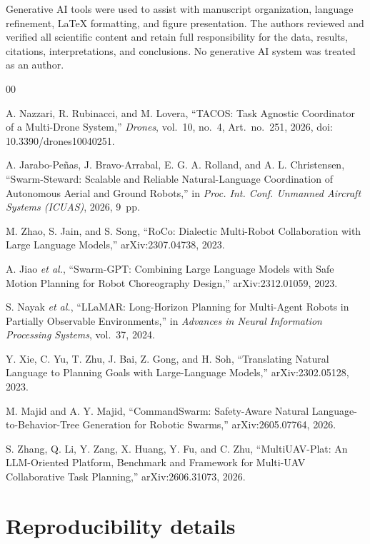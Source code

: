 \documentclass{article}
\begin{document}
Generative AI tools were used to assist with manuscript organization, language
refinement, \LaTeX{} formatting, and figure presentation. The authors reviewed
and verified all scientific content and retain full responsibility for the
data, results, citations, interpretations, and conclusions. No generative AI
system was treated as an author.

\begin{thebibliography}{00}

A. Nazzari, R. Rubinacci, and M. Lovera, ``TACOS: Task Agnostic Coordinator of
a Multi-Drone System,'' \emph{Drones}, vol.~10, no.~4, Art.~no.~251, 2026,
doi: 10.3390/drones10040251.

A. Jarabo-Pe\~nas, J. Bravo-Arrabal, E. G. A. Rolland, and A. L. Christensen,
``Swarm-Steward: Scalable and Reliable Natural-Language Coordination of
Autonomous Aerial and Ground Robots,'' in \emph{Proc. Int. Conf. Unmanned
Aircraft Systems (ICUAS)}, 2026, 9~pp.

M. Zhao, S. Jain, and S. Song, ``RoCo: Dialectic Multi-Robot Collaboration with
Large Language Models,'' arXiv:2307.04738, 2023.

A. Jiao \emph{et al.}, ``Swarm-GPT: Combining Large Language Models with Safe
Motion Planning for Robot Choreography Design,'' arXiv:2312.01059, 2023.

S. Nayak \emph{et al.}, ``LLaMAR: Long-Horizon Planning for Multi-Agent Robots
in Partially Observable Environments,'' in \emph{Advances in Neural
Information Processing Systems}, vol.~37, 2024.

Y. Xie, C. Yu, T. Zhu, J. Bai, Z. Gong, and H. Soh, ``Translating Natural
Language to Planning Goals with Large-Language Models,'' arXiv:2302.05128,
2023.

M. Majid and A. Y. Majid, ``CommandSwarm: Safety-Aware Natural
Language-to-Behavior-Tree Generation for Robotic Swarms,'' arXiv:2605.07764,
2026.

S. Zhang, Q. Li, Y. Zang, X. Huang, Y. Fu, and C. Zhu, ``MultiUAV-Plat: An
LLM-Oriented Platform, Benchmark and Framework for Multi-UAV Collaborative
Task Planning,'' arXiv:2606.31073, 2026.

\end{thebibliography}

\appendix

\section{Reproducibility details}
\label{app:reproducibility}
\end{document}
